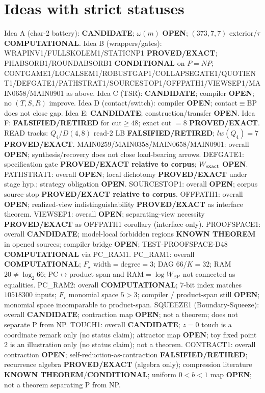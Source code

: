 \documentclass[11pt]{article}
\begin{document}
\section*{Ideas with strict statuses}
Idea A (char-2 battery): \textbf{CANDIDATE}; $\omega(m)$ \textbf{OPEN}; $(373,7,7)$ exterior/$\tau$ \textbf{COMPUTATIONAL}.
Idea B (wrappers/gates): WRAPINV1/FULLSKOLEM1/STATICNP1 \textbf{PROVED/EXACT};
PHABSORB1/ROUNDABSORB1 \textbf{CONDITIONAL} on $P=NP$;
CONTGAME1/LOCALSEM1/ROBUSTGAP1/COLLAPSEGATE1/QUOTIENT1/DEFGATE1/PATHSTRAT1/SOURCESTOP1/OFFPATH1/VIEWSEP1/MAIN0658/MAIN0901 as above.
Idea C (TSR): \textbf{CANDIDATE}; compiler \textbf{OPEN}; no $(T,S,R)$ improve.
Idea D (contact/switch): compiler \textbf{OPEN}; contact$\equiv$BP does not close gap.
Idea E: \textbf{CANDIDATE}; construction/transfer \textbf{OPEN}.
Idea F: \textbf{FALSIFIED/RETIRED} for cut$\ge48$; exact cut $=8$ \textbf{PROVED/EXACT}.
READ tracks: $Q_4$/$D(4,8)$ read-$2$ LB \textbf{FALSIFIED/RETIRED}; $lw(Q_4)=7$ \textbf{PROVED/EXACT}.
MAIN0259/MAIN0358/MAIN0658/MAIN0901: overall \textbf{OPEN}; synthesis/recovery does not close load-bearing arrows.
DEFGATE1: specification gate \textbf{PROVED/EXACT relative to corpus}; $W_{\rm exact}$ \textbf{OPEN}.
PATHSTRAT1: overall \textbf{OPEN}; local dichotomy \textbf{PROVED/EXACT} under stage hyp.; strategy obligation \textbf{OPEN}.
SOURCESTOP1: overall \textbf{OPEN}; corpus source-stop \textbf{PROVED/EXACT relative to corpus}.
OFFPATH1: overall \textbf{OPEN}; realized-view indistinguishability \textbf{PROVED/EXACT} as interface theorem.
VIEWSEP1: overall \textbf{OPEN}; separating-view necessity \textbf{PROVED/EXACT} as OFFPATH1 corollary (interface only).
PROOFSPACE1: overall \textbf{CANDIDATE}; model-local forbidden regions \textbf{KNOWN THEOREM} in opened sources;
compiler bridge \textbf{OPEN}; TEST-PROOFSPACE-D48 \textbf{COMPUTATIONAL} via PC\_RAM1.
PC\_RAM1: overall \textbf{COMPUTATIONAL}; $F_\star$ width$=$degree$=3$; DAG $66$/$K{=}32$; RAM $20\neq\log_2 66$;
PC$\leftrightarrow$product-span and RAM$=\log W_{\mathrm{BP}}$ not connected as equalities.
PC\_RAM2: overall \textbf{COMPUTATIONAL}; $7$-bit index matches $10518300$ inputs; $F_\star$ monomial space $5{>}3$;
compiler / product-span still \textbf{OPEN}; monomial space incomparable to product-span.
SQUEEZE1 (Boundary-Squeeze): overall \textbf{CANDIDATE}; contraction map \textbf{OPEN}; not a theorem;
does not separate P from NP.
TOUCH1: overall \textbf{CANDIDATE}; $z{=}0$ touch is a coordinate remark only (no status claim); attractor map \textbf{OPEN}; toy fixed point $2$ is an illustration only (no status claim); not a theorem.
CONTRACT1: overall contraction \textbf{OPEN}; self-reduction-as-contraction \textbf{FALSIFIED/RETIRED};
recurrence algebra \textbf{PROVED/EXACT} (algebra only); compression literature \textbf{KNOWN THEOREM}/\textbf{CONDITIONAL};
uniform $0{<}b{<}1$ map \textbf{OPEN}; not a theorem separating P from NP.
\end{document}
